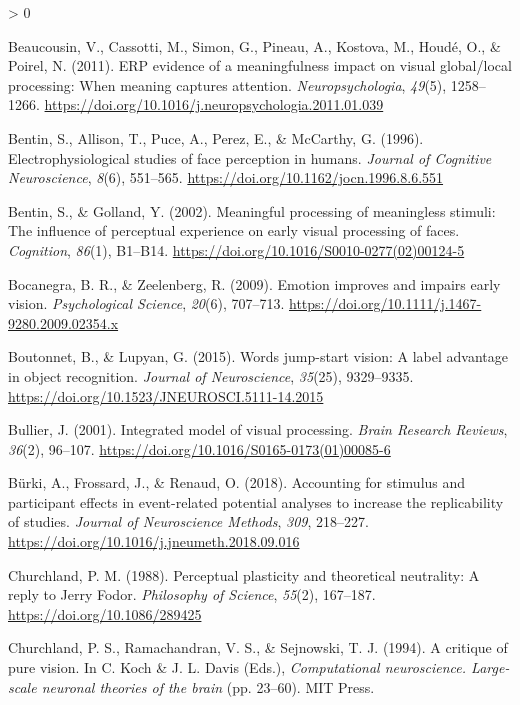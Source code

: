 \documentclass[
  english,
  doc,12pt,twoside,floatsintext]{apa7}
\newlength{\cslhangindent}
\newenvironment{CSLReferences}[2] %
 {%
  \setlength{\parindent}{0pt}
  \ifodd #1 \everypar{\setlength{\hangindent}{\cslhangindent}}\ignorespaces\fi
  \ifnum #2 > 0
  \setlength{\parskip}{#2\baselineskip}
  \fi
 }%
 {}
\begin{document}
\begin{CSLReferences}{1}{0}
\leavevmode\hypertarget{ref-beaucousin2011}{}%
Beaucousin, V., Cassotti, M., Simon, G., Pineau, A., Kostova, M., Houdé, O., \& Poirel, N. (2011). ERP evidence of a meaningfulness impact on visual global/local processing: When meaning captures attention. \emph{Neuropsychologia}, \emph{49}(5), 1258--1266. \url{https://doi.org/10.1016/j.neuropsychologia.2011.01.039}

\leavevmode\hypertarget{ref-bentin1996}{}%
Bentin, S., Allison, T., Puce, A., Perez, E., \& McCarthy, G. (1996). Electrophysiological studies of face perception in humans. \emph{Journal of Cognitive Neuroscience}, \emph{8}(6), 551--565. \url{https://doi.org/10.1162/jocn.1996.8.6.551}

\leavevmode\hypertarget{ref-bentin2002}{}%
Bentin, S., \& Golland, Y. (2002). Meaningful processing of meaningless stimuli: The influence of perceptual experience on early visual processing of faces. \emph{Cognition}, \emph{86}(1), B1--B14. \url{https://doi.org/10.1016/S0010-0277(02)00124-5}

\leavevmode\hypertarget{ref-bocanegra2009}{}%
Bocanegra, B. R., \& Zeelenberg, R. (2009). Emotion improves and impairs early vision. \emph{Psychological Science}, \emph{20}(6), 707--713. \url{https://doi.org/10.1111/j.1467-9280.2009.02354.x}

\leavevmode\hypertarget{ref-boutonnet2015}{}%
Boutonnet, B., \& Lupyan, G. (2015). Words jump-start vision: A label advantage in object recognition. \emph{Journal of Neuroscience}, \emph{35}(25), 9329--9335. \url{https://doi.org/10.1523/JNEUROSCI.5111-14.2015}

\leavevmode\hypertarget{ref-bullier2001}{}%
Bullier, J. (2001). Integrated model of visual processing. \emph{Brain Research Reviews}, \emph{36}(2), 96--107. \url{https://doi.org/10.1016/S0165-0173(01)00085-6}

\leavevmode\hypertarget{ref-buxfcrki2018}{}%
Bürki, A., Frossard, J., \& Renaud, O. (2018). Accounting for stimulus and participant effects in event-related potential analyses to increase the replicability of studies. \emph{Journal of Neuroscience Methods}, \emph{309}, 218--227. \url{https://doi.org/10.1016/j.jneumeth.2018.09.016}

\leavevmode\hypertarget{ref-churchland1988}{}%
Churchland, P. M. (1988). Perceptual plasticity and theoretical neutrality: A reply to {Jerry} {Fodor}. \emph{Philosophy of Science}, \emph{55}(2), 167--187. \url{https://doi.org/10.1086/289425}

\leavevmode\hypertarget{ref-churchland1994}{}%
Churchland, P. S., Ramachandran, V. S., \& Sejnowski, T. J. (1994). A critique of pure vision. In C. Koch \& J. L. Davis (Eds.), \emph{Computational neuroscience. Large-scale neuronal theories of the brain} (pp. 23--60). MIT Press.


\end{CSLReferences}
\end{document}
